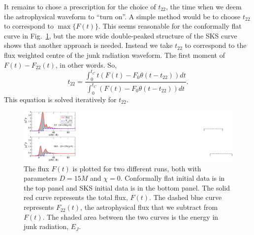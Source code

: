 It remains to chose a prescription for the choice of $t_{22}$, the
time when we deem the astrophysical waveform to ``turn on''.
A simple method would be to choose
$t_{22}$ to correspond to $\max\{F(t)\}$. This seems reasonable for
the conformally flat curve in Fig.~\ref{fig:FluxSample}, but the
more wide double-peaked structure of the SKS curve shows that another
approach is needed. Instead we take $t_{22}$ to correspond to the flux
weighted centre of the junk radiation waveform. The first moment of
$F(t)-F_{22}(t)$, in other words. So,
\begin{equation}\label{eq:t22}
t_{22}=\frac{\int_0^{t_C}{t\left(F\left(t\right)-F_0\theta\left(t-t_{22}\right)\right)dt}}{\int_0^{t_C}{\left(F\left(t\right)-F_0\theta\left(t-t_{22}\right)\right)dt}}.
\end{equation}
This equation is solved iteratively for $t_{22}$.

\begin{figure}
 \includegraphics[scale=0.95]{chap5/FluxSample}
  \caption[The flux, $F(t)$, and the computation of $E_J$ for CF and
  SKS intitial data.]{
The flux $F(t)$ is plotted for two different runs, both
    with parameters $D=15M$ and $\chi=0$. Conformally flat initial
    data is in the top panel and SKS initial data is in the bottom
    panel. The solid red curve represents the total flux, $F(t)$. The
    dashed blue curve represents $F_{22}(t)$, the astrophysical flux
    that we subtract from $F(t)$. The shaded area between the two
    curves is the energy in junk radiation, $E_J$.
}
  \label{fig:FluxSample}
\end{figure}

